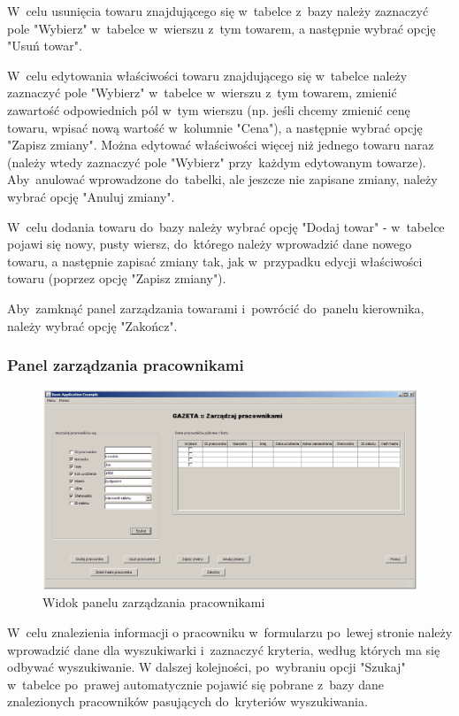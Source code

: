 W~celu usunięcia towaru znajdującego się w~tabelce z~bazy należy zaznaczyć pole "Wybierz" w~tabelce w~wierszu z~tym towarem, a następnie wybrać opcję "Usuń towar".

W~celu edytowania właściwości towaru znajdującego się w~tabelce należy zaznaczyć pole "Wybierz" w~tabelce w~wierszu z~tym towarem, zmienić zawartość odpowiednich pól w~tym wierszu (np. jeśli chcemy zmienić cenę towaru, wpisać nową wartość w~kolumnie "Cena"), a następnie wybrać opcję "Zapisz zmiany". Można edytować właściwości więcej niż jednego towaru naraz (należy wtedy zaznaczyć pole "Wybierz" przy~każdym edytowanym towarze). Aby~anulować wprowadzone do~tabelki, ale jeszcze nie zapisane zmiany, należy wybrać opcję "Anuluj zmiany".

W~celu dodania towaru do~bazy należy wybrać opcję "Dodaj towar" - w~tabelce pojawi się nowy, pusty wiersz, do~którego należy wprowadzić dane nowego towaru, a następnie zapisać zmiany tak, jak w~przypadku edycji właściwości towaru (poprzez opcję "Zapisz zmiany").

Aby~zamknąć panel zarządzania towarami i~powrócić do~panelu kierownika, należy wybrać opcję "Zakończ".
\subsubsection{Panel zarządzania pracownikami}
\begin{figure}
\includegraphics[width=1\textwidth]{gfx/zarzadzaj_pracownikami.png}
\caption{Widok panelu zarządzania pracownikami}
\end{figure}
W~celu znalezienia informacji o pracowniku w~formularzu po~lewej stronie należy wprowadzić dane dla wyszukiwarki i~zaznaczyć kryteria, według których ma się odbywać wyszukiwanie. W dalszej kolejności, po~wybraniu opcji "Szukaj" w~tabelce po~prawej automatycznie pojawić się pobrane z~bazy dane znalezionych pracowników pasujących do~kryteriów wyszukiwania.

